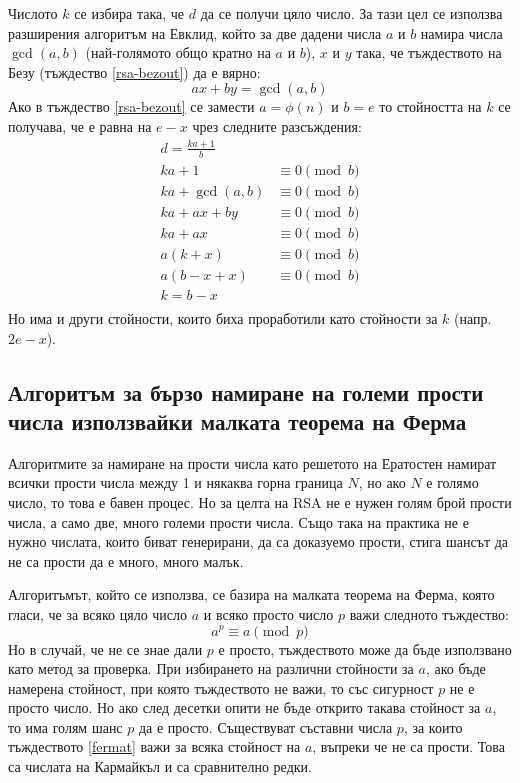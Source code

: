   Числото $k$ се избира така, че $d$ да се получи цяло число. За тази цел се използва разширения алгоритъм на Евклид, който за две дадени числа $a$ и $b$ намира числа $\gcd(a,b)$ (най-голямото общо кратно на $a$ и $b$), $x$ и $y$ така, че тъждеството на Безу (тъждество \ref{rsa-bezout}) да е вярно:
  \begin{equation}
    ax+by = \gcd(a,b)
    \label{rsa-bezout}
  \end{equation}
  Ако в тъждество \ref{rsa-bezout} се замести $a=\phi(n)$ и $b=e$ то стойността на $k$ се получава, че е равна на $e-x$ чрез следните разсъждения:
  \begin{equation}
    \begin{alignedat}{1}
      d = \frac{ka+1}{b} \\
      ka + 1 &\equiv 0 \pmod{b} \\
      ka + \gcd(a,b) &\equiv 0 \pmod{b} \\
      ka + ax + by &\equiv 0 \pmod{b} \\
      ka + ax &\equiv 0 \pmod{b} \\
      a(k+x) &\equiv 0 \pmod{b} \\
      a(b-x+x) &\equiv 0 \pmod{b} \\
      k = b - x \\
    \end{alignedat}
    \label{rsa-finding-k}
  \end{equation}
  Но има и други стойности, които биха проработили като стойности за $k$ (напр. $2e-x$).

  \subsection{Алгоритъм за бързо намиране на големи прости числа използвайки малката теорема на Ферма} \label{primesalgo}
  Алгоритмите за намиране на прости числа като решетото на Ератостен\cite{primesieve} намират всички прости числа между 1 и някаква горна граница $N$, но ако $N$ е голямо число, то това е бавен процес. Но за целта на RSA не е нужен голям брой прости числа, а само две, много големи прости числа. Също така на практика не е нужно числата, които биват генерирани, да са доказуемо прости, стига шансът да не са прости да е много, много малък.

  Алгоритъмът, който се използва, се базира на малката теорема на Ферма, която гласи, че за всяко цяло число $a$ и всяко просто число $p$ важи следното тъждество:
  \begin{equation}
    a^p \equiv a \pmod{p}
    \label{fermat}
  \end{equation}
  Но в случай, че не се знае дали $p$ е просто, тъждеството може да бъде използвано като метод за проверка. При избирането на различни стойности за $a$, ако бъде намерена стойност, при която тъждеството не важи, то със сигурност $p$ не е просто число. Но ако след десетки опити не бъде открито такава стойност за $a$, то има голям шанс $p$ да е просто.
  Съществуват съставни числа $p$, за които тъждеството \ref{fermat} важи за всяка стойност на $a$, въпреки че не са прости. Това са числата на Кармайкъл и са сравнително редки.\cite{carmichaelrare} %

